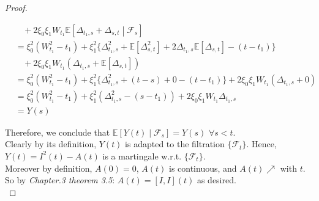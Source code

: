 \documentclass[a4paper, 10pt]{article}
\theoremstyle{definition}
\theoremstyle{hSol}
\begin{document}
\begin{proof}
\begin{itemize}
\begin{equation}
\begin{split}
			&~~~~+ 2\xi_0 \xi_1 W_{t_1}\mathbb{E}\left[\Delta_{t_1,s}+\Delta_{s,t}\middle|\mathcal{F}_s\right] \\
			&=\xi_0^2 (W_{t_1}^2 - t_1) + \xi_1^2 \{\Delta_{t_1,s}^2+\mathbb{E}\left[\Delta_{s,t}^2\right]+2\Delta_{t_1,s}\mathbb{E}\left[\Delta_{s,t}\right] - (t-t_1)\} \\
			&~~~~+ 2\xi_0 \xi_1 W_{t_1}(\Delta_{t_1,s}+\mathbb{E}\left[\Delta_{s,t}\right]) \\
			&=\xi_0^2 (W_{t_1}^2 - t_1) + \xi_1^2 \{\Delta_{t_1,s}^2+(t-s)+0-(t-t_1)\} + 2\xi_0 \xi_1 W_{t_1}(\Delta_{t_1,s}+0) \\
			&=\xi_0^2 (W_{t_1}^2 - t_1) + \xi_1^2 (\Delta_{t_1,s}^2 - (s-t_1)) + 2\xi_0 \xi_1 W_{t_1}\Delta_{t_1, s}\\
			&=Y(s)
		\end{split}
	\end{equation}
\end{itemize}
Therefore, we conclude that $\mathbb{E}\left[Y(t)\middle|\mathcal{F}_s\right] = Y(s)$ $\forall s < t$. \\
Clearly by its definition, $Y(t)$ is adapted to the filtration $\{\mathcal{F}_t\}$. Hence, $Y(t)=I^2(t)-A(t)$ is a martingale w.r.t. $\{\mathcal{F}_t\}$.\\
Moreover by definition, $A(0) = 0$, $A(t)$ is continuous, and $A(t)\nearrow$ with $t$. So by \textit{Chapter.3 theorem 3.5}: $A(t) = [I,I](t)$ as desired.
~\\
\end{proof}
\end{document}

